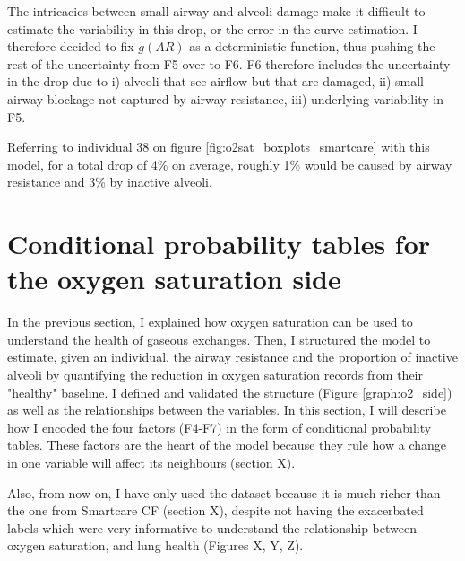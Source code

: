 The intricacies between small airway and alveoli damage make it difficult to estimate the variability in this drop, or the error in the curve estimation. I therefore decided to fix $g(AR)$ as a deterministic function, thus pushing the rest of the uncertainty from F5 over to F6. F6 therefore includes the uncertainty in the \SP drop due to i) alveoli that see airflow but that are damaged, ii) small airway blockage  not captured by airway resistance, iii) underlying variability in F5. 

Referring to individual 38 on figure \ref{fig:o2sat_boxplots_smartcare} with this model, for a total \SP drop of 4\% on average, roughly 1\% would be caused by airway resistance and 3\% by inactive alveoli.



\section{Conditional probability tables for the oxygen saturation side}
In the previous section, I explained how oxygen saturation can be used to understand the health of gaseous exchanges. Then, I structured the model to estimate, given an individual, the airway resistance and the proportion of inactive alveoli by quantifying the reduction in oxygen saturation records from their "healthy" baseline. I defined and validated the structure (Figure \ref{graph:o2_side}) as well as the relationships between the variables. In this section, I will describe how I encoded the four factors (F4-F7) in the form of conditional probability tables. These factors are the heart of the model because they rule how a change in one variable will affect its neighbours (section X). 

Also, from now on, I have only used the \BR dataset because it is much richer than the one from Smartcare CF (section X), despite not having the exacerbated labels which were very informative to understand the relationship between oxygen saturation, \F and lung health (Figures X, Y, Z).


